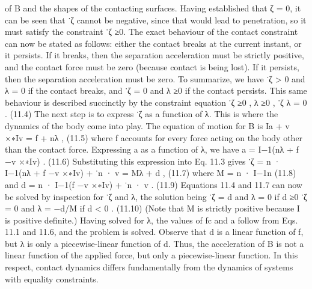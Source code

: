 of B and the shapes of the contacting surfaces. Having established that ζ = 0, it can be seen that ˙ζ cannot be negative, since that would lead to penetration, so it must satisfy the constraint ˙ζ ≥0. The exact behaviour of the contact constraint can now be stated as follows: either the contact breaks at the current instant, or it persists. If it breaks, then the separation acceleration must be strictly positive, and the contact force must be zero (because contact is being lost). If it persists, then the separation acceleration must be zero. To summarize, we have ˙ζ > 0 and λ = 0 if the contact breaks, and ˙ζ = 0 and λ ≥0 if the contact persists. This same behaviour is described succinctly by the constraint equation ˙ζ ≥0 , λ ≥0 , ˙ζ λ = 0 . (11.4) The next step is to express ˙ζ as a function of λ. This is where the dynamics of the body come into play. The equation of motion for B is Ia + v ×∗Iv = f + nλ , (11.5) where f accounts for every force acting on the body other than the contact force. Expressing a as a function of λ, we have a = I−1(nλ + f −v ×∗Iv) . (11.6) Substituting this expression into Eq. 11.3 gives ˙ζ = n · I−1(nλ + f −v ×∗Iv) + ˙n · v = Mλ + d , (11.7) where M = n · I−1n (11.8) and d = n · I−1(f −v ×∗Iv) + ˙n · v . (11.9) Equations 11.4 and 11.7 can now be solved by inspection for ˙ζ and λ, the solution being ˙ζ = d and λ = 0 if d ≥0 ˙ζ = 0 and λ = −d/M if d < 0 . (11.10) (Note that M is strictly positive because I is positive definite.) Having solved for λ, the values of fc and a follow from Eqs. 11.1 and 11.6, and the problem is solved. Observe that d is a linear function of f, but λ is only a piecewise-linear function of d. Thus, the acceleration of B is not a linear function of the applied force, but only a piecewise-linear function. In this respect, contact dynamics differs fundamentally from the dynamics of systems with equality constraints.

